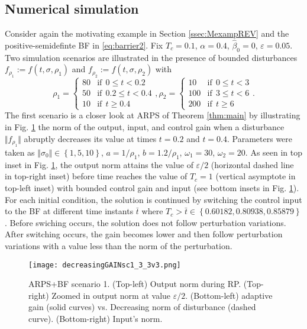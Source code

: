 \documentclass[twocolumn]{autart}    %
\begin{document}
\subsection{Numerical simulation}
\vspace{-3mm}
{Consider again the motivating example in Section \ref{ssec:MexampREV} and the positive-semidefinte BF in \eqref{eq:barrier2}.  Fix $T_c=0.1$, $\alpha=0.4$, $\hat{\beta}_0=0$, $\varepsilon=0.05$. Two simulation scenarios are illustrated in the presence of bounded disturbances $f_{\rho_1}:=f(t,\sigma,\rho_1)$  and $f_{\rho_2}:=f(t,\sigma,\rho_2)$ with  
\begin{equation*}
\rho_1\!=\!\begin{cases}
          80 &\text{if} \:\: 0\leq t <0.2\\
          50 &\text{if} \:\: 0.2\leq t <0.4\\
          10 & \text{if} \:\: t\geq 0.4
     \end{cases},\rho_2\!=\!\begin{cases}
          10 &\text{if} \:\: 0\leq t <3\\
          100 &\text{if} \:\: 3\leq t <6\\
          200 & \text{if} \:\: t\geq 6
     \end{cases}.
\end{equation*} The first scenario is a closer look at ARPS of Theorem \ref{thm:main} by illustrating in Fig. \ref{fig:ex3sc2_decreasing} the norm of the output, input,  and control gain when a disturbance $\Vert f_{\rho_1} \Vert$ abruptly decreases its value at times $t=0.2$ and $t=0.4$.  Parameters were taken as $\Vert \sigma_0 \Vert \in \left\lbrace 1,5,10 \right\rbrace$, $a=1/\rho_1$, $b=1.2/\rho_1$, $\omega_1=30$, $\omega_2=20$.  As seen in top inset in Fig. \ref{fig:ex3sc2_decreasing}, the output norm attains the value of $\varepsilon/2$ (horizontal dashed line in top-right inset) before time reaches the value of $T_c=1$ (vertical asymptote in top-left inset)  with bounded control gain and input (see bottom insets in Fig. \ref{fig:ex3sc2_decreasing}). For each initial condition,  the solution is continued by switching the control input to the BF at different time instants $\bar{t}$ where $T_c>\bar{t}\in \left\lbrace 0.60182,0.80938,0.85879 \right\rbrace$. Before swiching occurs, the solution does not follow perturbation variations. After switching occurs, the gain becomes lower and then follow perturbation variations with a value less than the norm of the perturbation.}
\begin{figure}
\centering
\texttt{[image: decreasingGAINsc1\_3\_3v3.png]}%
\caption{ARPS+BF scenario 1. (Top-left) Output norm during RP.  (Top-right) Zoomed in output norm at value $\varepsilon/2$. (Bottom-left) adaptive gain (solid curves) vs. Decreasing norm of disturbance (dashed curve). (Bottom-right) Input's norm. }
\label{fig:ex3sc2_decreasing}
\end{figure} %
\end{document}
